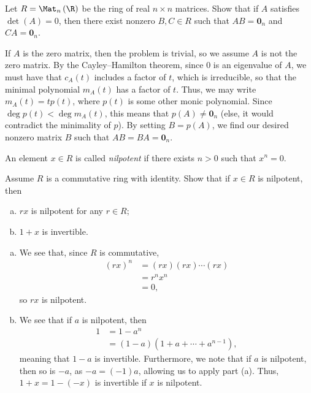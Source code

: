 \documentclass[10pt]{mypackage}
\begin{document}
\begin{problem}[Problem 5]
  Let $ R = \Mat_{n}\left( \R \right) $ be the ring of real $n\times n$ matrices. Show that if $A$ satisfies $\det\left( A \right) = 0$, then there exist nonzero $B,C\in R$ such that $AB = \mathbf{0}_{n}$ and $CA = \mathbf{0}_{n}$.
\end{problem}
\begin{solution}
  If $A$ is the zero matrix, then the problem is trivial, so we assume $A$ is not the zero matrix. By the Cayley--Hamilton theorem, since $0$ is an eigenvalue of $A$, we must have that $c_A(t)$ includes a factor of $t$, which is irreducible, so that the minimal polynomial $m_A(t)$ has a factor of $t$. Thus, we may write $m_A(t) = tp(t)$, where $p(t)$ is some other monic polynomial. Since $\deg p(t) < \deg m_A(t)$, this means that $p(A)\neq \mathbf{0}_n$ (else, it would contradict the minimality of $p$). By setting $B = p(A)$, we find our desired nonzero matrix $B$ such that $AB = BA = \mathbf{0}_n$.
\end{solution}
\begin{problem}[Problem 6]
  An element $x\in R$ is called \textit{nilpotent} if there exists $n > 0$ such that $x^{n} = 0$.\newline

  Assume $R$ is a commutative ring with identity. Show that if $x\in R$ is nilpotent, then
  \begin{enumerate}[(a)]
    \item $rx$ is nilpotent for any $r\in R$;
    \item $1+x$ is invertible.
  \end{enumerate}
\end{problem}
\begin{solution}\hfill
  \begin{enumerate}[(a)]
    \item We see that, since $R$ is commutative,
      \begin{align*}
        \left( rx \right)^{n} &= \left( rx \right)\left( rx \right)\cdots \left( rx \right)\\
                              &= r^{n}x^{n}\\
                              &= 0,
      \end{align*}
      so $rx$ is nilpotent.
    \item We see that if $a$ is nilpotent, then
      \begin{align*}
        1 &= 1-a^{n}\\
          &= \left( 1-a \right)\left( 1 + a + \cdots + a^{n-1} \right),
      \end{align*}
      meaning that $1-a$ is invertible. Furthermore, we note that if $a$ is nilpotent, then so is $-a$, as $-a = \left( -1 \right)a$, allowing us to apply part (a). Thus, $1+x = 1-\left( -x \right)$ is invertible if $x$ is nilpotent.
  \end{enumerate}
\end{solution}
\end{document}
